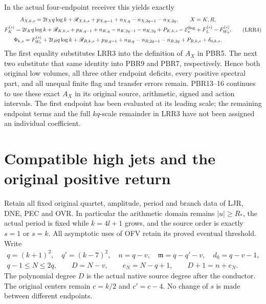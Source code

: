 \documentclass[11pt,a4paper]{article}
\begin{document}
In the actual four-endpoint receiver this yields exactly
\[
\begin{gathered}
 A_{X,k,s}
 =2t_Xq\log k+\mathscr R_{X,k,s}+p_{X,q-1}
       +n_{X,q}-n_{X,2q-1}-n_{X,2q},\qquad X=K,R,\\
 F_K^{(s)}
 =2t_Kq\log k+\mathscr R_{K,k,s}+p_{K,q-1}
       +n_{K,q}-n_{K,2q-1}-n_{K,2q}
       +P_{K,k,s}-\mathcal E_s^{\rm flag}
       +F_L^{(s)}-F_{W_0}^{(s)},\\
 \Phi_{k,s}
 =F_{W_0}^{(s)}+2t_Rq\log k
       +\mathscr R_{R,k,s}+p_{R,q-1}
       +n_{R,q}-n_{R,2q-1}-n_{R,2q}
       +P_{R,k,s}+\delta_{0,k,s}.
\end{gathered}\tag{LRR4}
\]
The first equality substitutes LRR3 into the definition of
$A_X$ in PBR5. The next two substitute that same identity
into PBR9 and PBR7, respectively. Hence both original low
volumes, all three other endpoint deficits, every positive
spectral part, and all unequal finite flag and transfer errors
remain. PBR13--16 continues to use these exact $A_X$ in its
original source, arithmetic, signed and action intervals.
The first endpoint has been evaluated at its leading scale;
the remaining endpoint terms and the full $kq$-scale remainder
in LRR3 have not been assigned an individual coefficient.

\clearpage
\section{Compatible high jets and the original positive return}
\label{sec:HJR}

Retain all fixed original quartet, amplitude, period and branch data
of LJR, DNE, PEC and OVR. In particular the arithmetic domain remains
$|u|\ge R_*$, the actual period is fixed while $k=4l+1$ grows, and
the source order is exactly $s=1$ or $s=k$. All asymptotic uses of
OFV retain its proved eventual threshold. Write
\[
 \begin{gathered}
 q=(k+1)^2,\quad q'=(k-7)^2,\quad
 n=q-v,\quad \mathfrak m=q-q'-v,\quad d_0=q-v-1,\\
 q-1\le N\le2q,\qquad D=N-v,\qquad
 e_N=N-q+1,\qquad D+1=n+e_N.
 \end{gathered}\tag{HJR1}
\]
The polynomial degree $D$ is the actual native source degree after
the conductor. The original centers remain $c=k/2$ and $c'=c-4$.
No change of $s$ is made between different endpoints.
\end{document}
